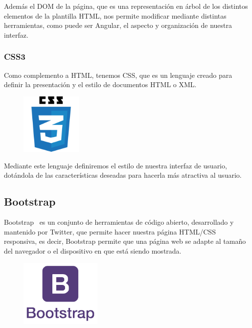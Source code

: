 \documentclass[a4paper, spanish, 12pt]{book}
\begin{document}
Adem\'as el DOM de la p\'agina, que es una representaci\'on en \'arbol de los distintos
elementos de la plantilla HTML, nos permite modificar mediante distintas herramientas,
como puede ser Angular, el aspecto y organizaci\'on de nuestra interfaz.

\subsubsection*{CSS3}
\label{subsec:css3}

Como complemento a HTML, tenemos CSS, que es un lenguaje creado para definir la presentaci\'on
y el estilo de documentos HTML o XML.

\begin{figure}[H]
  \centering
  \includegraphics[width=3cm, keepaspectratio]{img/css3-logo}
\end{figure}

Mediante este lenguaje definiremos el estilo de nuestra interfaz de usuario, dot\'andola
de las caracter\'isticas deseadas para hacerla m\'as atractiva al usuario.

\subsection{Bootstrap}
\label{subsec:bootstrap}

Bootstrap~\cite{bootstrap} es un conjunto de herramientas de c\'odigo abierto, desarrollado y mantenido
por Twitter, que permite hacer nuestra p\'agina HTML/CSS responsiva, es decir,
Bootstrap permite que una página web se adapte al tama\~no del navegador o el dispositivo en que
est\'a siendo mostrada.

\begin{figure}[H]
  \centering
  \includegraphics[width=4cm, keepaspectratio]{img/bootstrap-logo}
\end{figure}
\end{document}
